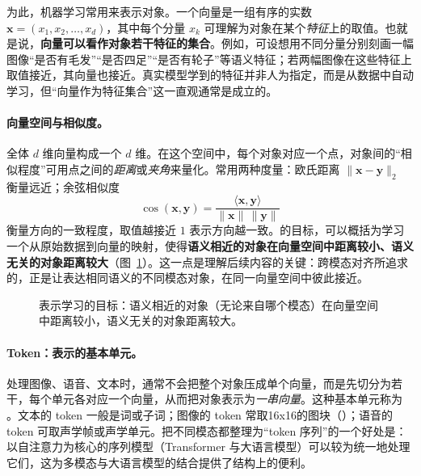 为此，机器学习常用来表示对象。一个向量是一组有序的实数 $\mathbf{x}=(x_1,x_2,\dots,x_d)$，其中每个分量 $x_k$ 可理解为对象在某个\emph{特征}上的取值。也就是说，\textbf{向量可以看作对象若干特征的集合}。例如，可设想用不同分量分别刻画一幅图像“是否有毛发”“是否四足”“是否有轮子”等语义特征；若两幅图像在这些特征上取值接近，其向量也接近。真实模型学到的特征并非人为指定，而是从数据中自动学习，但“向量作为特征集合”这一直观通常是成立的。

\paragraph{向量空间与相似度。}全体 $d$ 维向量构成一个 $d$ 维。在这个空间中，每个对象对应一个点，对象间的“相似程度”可用点之间的\emph{距离}或\emph{夹角}来量化。常用两种度量：欧氏距离 $\lVert \mathbf{x}-\mathbf{y}\rVert_2$ 衡量远近；余弦相似度
\begin{equation}
  \cos(\mathbf{x},\mathbf{y})=\frac{\langle \mathbf{x},\mathbf{y}\rangle}{\lVert\mathbf{x}\rVert\,\lVert\mathbf{y}\rVert}
\end{equation}
衡量方向的一致程度，取值越接近 $1$ 表示方向越一致。的目标，可以概括为学习一个从原始数据到向量的映射，使得\textbf{语义相近的对象在向量空间中距离较小、语义无关的对象距离较大}（图~\ref{fig:vecspace}）。这一点是理解后续内容的关键：跨模态对齐所追求的，正是让表达相同语义的不同模态对象，在同一向量空间中彼此接近。

\begin{figure}[htbp]
  \centering
  \caption{表示学习的目标：语义相近的对象（无论来自哪个模态）在向量空间中距离较小，语义无关的对象距离较大。}
  \label{fig:vecspace}
\end{figure}

\paragraph{Token：表示的基本单元。}处理图像、语音、文本时，通常不会把整个对象压成单个向量，而是先切分为若干，每个单元各对应一个向量，从而把对象表示为\emph{一串向量}。这种基本单元称为 。文本的 token 一般是词或子词；图像的 token 常取16x16的图块（）；语音的 token 可取声学帧或声学单元。把不同模态都整理为“token 序列”的一个好处是：以自注意力为核心的序列模型（Transformer 与大语言模型）可以较为统一地处理它们，这为多模态与大语言模型的结合提供了结构上的便利。

